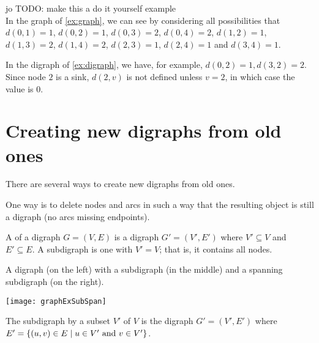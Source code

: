 \begin{Boxample}[2]
jo TODO: make this a do it yourself example \\
In the graph of \cref{ex:graph}, we can see by considering
all possibilities that $d(0, 1) = 1$, $d(0, 2) = 1$, $d(0, 3) = 2$,
$d(0, 4) = 2$, $d(1, 2) = 1$, $d(1, 3) = 2$, $d(1, 4) = 2$, $d(2, 3) =
1$, $d(2, 4) = 1$ and $d(3, 4) = 1$.

In the digraph of \cref{ex:digraph}, we have, for example, $d(0, 2) = 1, d(3, 2) = 2$. 
Since node $2$ is a sink, $d(2, v)$ is not defined unless $v = 2$, in which case the value is $0$.
\end{Boxample}



\section{Creating new digraphs from old ones}

There are several ways to create new digraphs from old ones.

One way is to delete nodes and arcs in such a way that the 
resulting object is still a digraph (no arcs missing
endpoints).

\begin{Definition}
A  of a digraph $G = (V, E)$ is a digraph $G' = (V', E')$ 
where $V'\subseteq V$ and $E'\subseteq E$. 
A  subdigraph is one with $V' = V$; that is, it contains all nodes.
\end{Definition}

\begin{Example}
A digraph (on the left) with a subdigraph (in the middle) and a spanning subdigraph (on the right).
\begin{center}
\texttt{[image: graphExSubSpan]} 
\end{center}
\end{Example}

\begin{Definition}
The subdigraph  by a subset $V'$ of $V$ is the digraph
$G' = (V', E')$ where $E' = \mbox{$\{(u, v) \in E \mid u \in V' \mbox{ and } v\in V'\}$}$.
\end{Definition}


